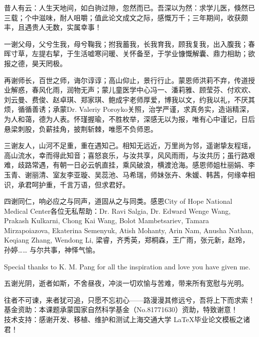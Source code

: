 \begin{thanks}
  昔人有云：人生天地间，如白驹过隙，忽然而已。吾深以为然：求学儿医，倏然已三载；个中滋味，耐人咀嚼；值此论文成文之际，感慨万千；三年期间，收获颇丰，且遇贵人无数，实属幸事！

  一谢父母，父兮生我，母兮鞠我；拊我蓄我，长我育我，顾我复我，出入腹我；春晖寸草，左提右挈，于生活嘘寒问暖、关怀备至，于学业慷慨解囊、鼎力相助；欲报之德，昊天罔极。

  再谢师长，百世之师，诲尔谆谆；高山仰止，景行行止。蒙恩师洪莉不弃，传道授业解惑，春风化雨，润物无声；蒙儿童医学中心冯一、潘莉雅、顾莹芬、付欢欢、刘云曼、费俊、赵卓琪、郑家琪、鲍成宇老师厚爱，博我以文，约我以礼，不厌其烦，循循善诱；承蒙Dr. Valeriy Poroyko关照，治学严谨，求真务实，造诣精深，为人和蔼，德为人表。怀瑾握瑜，不胜枚举，深感无以为报，唯有心中谨记，日后悬梁刺股，负薪挂角，披荆斩棘，唯愿不负师恩。

  三谢友人，山河不足重，重在遇知己。相知无远近，万里尚为邻，遥谢挚友程瑶，高山流水，幸而得此知音；喜怒哀乐，与汝共享，风风雨雨，与汝共历；虽行路艰难，歧路常遇，有朝一日必云帆直挂，乘风破浪，横渡沧海。感恩师姐杜丽娟、李玉青、谢丽清、室友李亚璇、吴蕊池、马希瑞，师妹张卉、朱媛、韩茜，何缘幸相识，承君呵护重，千言万语，但求君好。

  四谢同仁，响必应之与同声，道固从之与同类。感恩City of Hope National Medical Center各位无私帮助：Dr. Ravi Salgia, Dr. Edward Wenge Wang, Prakash Kulkarni, Chong Kai Wang, Bolot Mambetsariev, Tamara Mirzapoiazova, Ekaterina Semenyuk, Atish Mohanty, Arin Nam, Anusha Nathan, Keqiang Zhang, Wendong Li, 梁睿，齐秀英，郑桐森，王广雨，张元新，赵玲，孙婷…… 与尔共事，神怿气愉。

  Special thanks to K. M. Pang for all the inspiration and love you have given me.

  五谢光阴，逝者如斯，不舍昼夜，冲淡一切欢愉与苦难，带来所有宽慰与光明。

  往者不可谏，来者犹可追，只愿不忘初心——路漫漫其修远兮，吾将上下而求索！\\
  基金资助：本课题承蒙国家自然科学基金（No.81771630）资助，特致谢意！\\
  技术支持：感谢开发、移植、维护和测试上海交通大学 \LaTeX 毕业论文模板之诸君！\\
\end{thanks}

